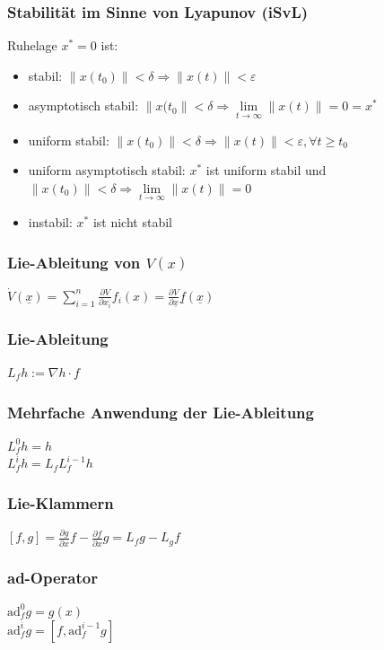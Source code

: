 \documentclass[german]{latex4ei/latex4ei_sheet}
\begin{document}
\subsubsection*{Stabilität im Sinne von Lyapunov (iSvL)}
Ruhelage $x^* = 0$ ist:
\begin{itemize}
  \item stabil: $\|x(t_0)\| < \delta \Rightarrow \|x(t)\| < \varepsilon$
  \item asymptotisch stabil: $\|x(t_0\| < \delta \Rightarrow \lim\limits_{t \rightarrow \infty} \|x(t)\| = 0 = x^*$
  \item uniform stabil: $\|x(t_0)\| < \delta \Rightarrow \|x(t)\| < \varepsilon, \forall t \geq t_0$
  \item uniform asymptotisch stabil: $x^*$ ist uniform stabil und \\ $\|x(t_0)\| < \delta \Rightarrow \lim\limits_{t \rightarrow \infty} \|x(t)\| = 0$
  \item instabil: $x^*$ ist nicht stabil
\end{itemize}

\subsubsection*{Lie-Ableitung von $V(x)$}
$\dot{V}(\underline{x}) = \sum\limits_{i=1}^{n} \frac{\partial V}{\partial x_i}f_i(x) = \frac{\partial V}{\partial \underline{x}} \underline{f}(\underline{x}) $

\subsubsection*{Lie-Ableitung}
$L_f h := \nabla h \cdot f$

\subsubsection*{Mehrfache Anwendung der Lie-Ableitung}
$L_f^0 h = h$ \\
$L_f^i h = L_f L_f^{i-1} h$

\subsubsection*{Lie-Klammern}
$\left[ f,g \right] = \frac{\partial g}{\partial x} f - \frac{\partial f}{\partial x} g = L_f g - L_g f$

\subsubsection*{ad-Operator}
$\text{ad}_f^0 g = g(x)$ \\
$\text{ad}_f^i g = \left[ f, \text{ad}_f^{i-1} g \right]$
\end{document}
